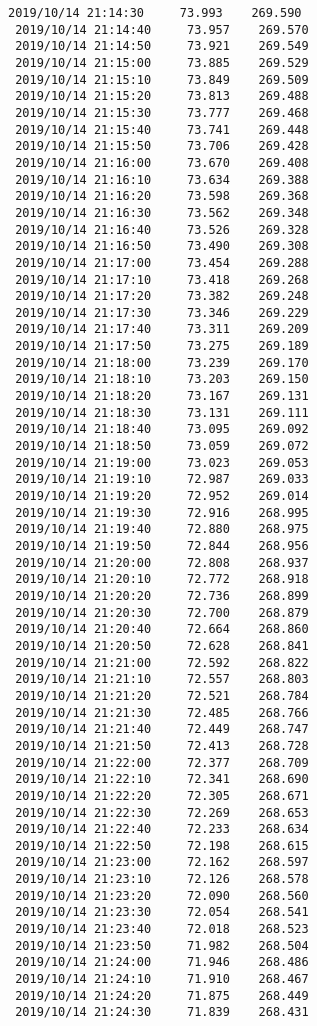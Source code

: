 \documentclass[11pt]{article}
\begin{document}
\begin{Verbatim}[commandchars=\\\{\}]
 2019/10/14 21:14:30     73.993    269.590
 2019/10/14 21:14:40     73.957    269.570
 2019/10/14 21:14:50     73.921    269.549
 2019/10/14 21:15:00     73.885    269.529
 2019/10/14 21:15:10     73.849    269.509
 2019/10/14 21:15:20     73.813    269.488
 2019/10/14 21:15:30     73.777    269.468
 2019/10/14 21:15:40     73.741    269.448
 2019/10/14 21:15:50     73.706    269.428
 2019/10/14 21:16:00     73.670    269.408
 2019/10/14 21:16:10     73.634    269.388
 2019/10/14 21:16:20     73.598    269.368
 2019/10/14 21:16:30     73.562    269.348
 2019/10/14 21:16:40     73.526    269.328
 2019/10/14 21:16:50     73.490    269.308
 2019/10/14 21:17:00     73.454    269.288
 2019/10/14 21:17:10     73.418    269.268
 2019/10/14 21:17:20     73.382    269.248
 2019/10/14 21:17:30     73.346    269.229
 2019/10/14 21:17:40     73.311    269.209
 2019/10/14 21:17:50     73.275    269.189
 2019/10/14 21:18:00     73.239    269.170
 2019/10/14 21:18:10     73.203    269.150
 2019/10/14 21:18:20     73.167    269.131
 2019/10/14 21:18:30     73.131    269.111
 2019/10/14 21:18:40     73.095    269.092
 2019/10/14 21:18:50     73.059    269.072
 2019/10/14 21:19:00     73.023    269.053
 2019/10/14 21:19:10     72.987    269.033
 2019/10/14 21:19:20     72.952    269.014
 2019/10/14 21:19:30     72.916    268.995
 2019/10/14 21:19:40     72.880    268.975
 2019/10/14 21:19:50     72.844    268.956
 2019/10/14 21:20:00     72.808    268.937
 2019/10/14 21:20:10     72.772    268.918
 2019/10/14 21:20:20     72.736    268.899
 2019/10/14 21:20:30     72.700    268.879
 2019/10/14 21:20:40     72.664    268.860
 2019/10/14 21:20:50     72.628    268.841
 2019/10/14 21:21:00     72.592    268.822
 2019/10/14 21:21:10     72.557    268.803
 2019/10/14 21:21:20     72.521    268.784
 2019/10/14 21:21:30     72.485    268.766
 2019/10/14 21:21:40     72.449    268.747
 2019/10/14 21:21:50     72.413    268.728
 2019/10/14 21:22:00     72.377    268.709
 2019/10/14 21:22:10     72.341    268.690
 2019/10/14 21:22:20     72.305    268.671
 2019/10/14 21:22:30     72.269    268.653
 2019/10/14 21:22:40     72.233    268.634
 2019/10/14 21:22:50     72.198    268.615
 2019/10/14 21:23:00     72.162    268.597
 2019/10/14 21:23:10     72.126    268.578
 2019/10/14 21:23:20     72.090    268.560
 2019/10/14 21:23:30     72.054    268.541
 2019/10/14 21:23:40     72.018    268.523
 2019/10/14 21:23:50     71.982    268.504
 2019/10/14 21:24:00     71.946    268.486
 2019/10/14 21:24:10     71.910    268.467
 2019/10/14 21:24:20     71.875    268.449
 2019/10/14 21:24:30     71.839    268.431

\end{Verbatim}
\end{document}
